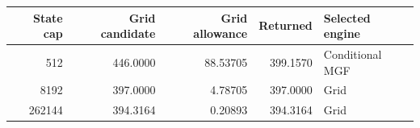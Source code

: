 \begin{tabular}{rrrrl}
\toprule
State cap & Grid candidate & Grid allowance & Returned & Selected engine \\
\midrule
512 & 446.0000 & 88.53705 & 399.1570 & Conditional MGF \\
8192 & 397.0000 & 4.78705 & 397.0000 & Grid \\
262144 & 394.3164 & 0.20893 & 394.3164 & Grid \\
\bottomrule
\end{tabular}
